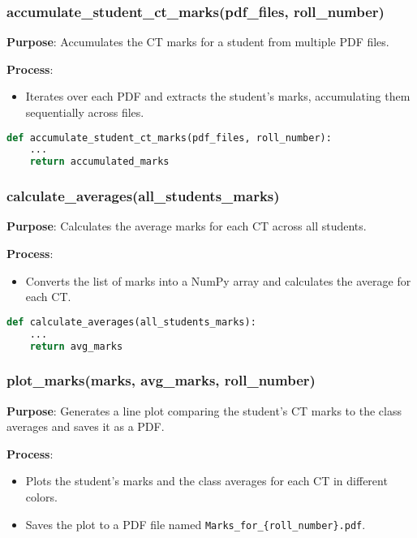 \documentclass{article}
\begin{document}
\subsubsection{accumulate\_student\_ct\_marks(pdf\_files, roll\_number)}
\textbf{Purpose}: Accumulates the CT marks for a student from multiple PDF files.

\textbf{Process}:
\begin{itemize}
    \item Iterates over each PDF and extracts the student's marks, accumulating them sequentially across files.
\end{itemize}

\begin{lstlisting}[language=Python, caption=Function to Accumulate Student Marks Across PDFs]
def accumulate_student_ct_marks(pdf_files, roll_number):
    ...
    return accumulated_marks
\end{lstlisting}

\subsubsection{calculate\_averages(all\_students\_marks)}
\textbf{Purpose}: Calculates the average marks for each CT across all students.

\textbf{Process}:
\begin{itemize}
    \item Converts the list of marks into a NumPy array and calculates the average for each CT.
\end{itemize}

\begin{lstlisting}[language=Python, caption=Function to Calculate Class Averages]
def calculate_averages(all_students_marks):
    ...
    return avg_marks
\end{lstlisting}

\subsubsection{plot\_marks(marks, avg\_marks, roll\_number)}
\textbf{Purpose}: Generates a line plot comparing the student's CT marks to the class averages and saves it as a PDF.

\textbf{Process}:
\begin{itemize}
    \item Plots the student's marks and the class averages for each CT in different colors.
    \item Saves the plot to a PDF file named \texttt{Marks\_for\_\{roll\_number\}.pdf}.
\end{itemize}
\end{document}

